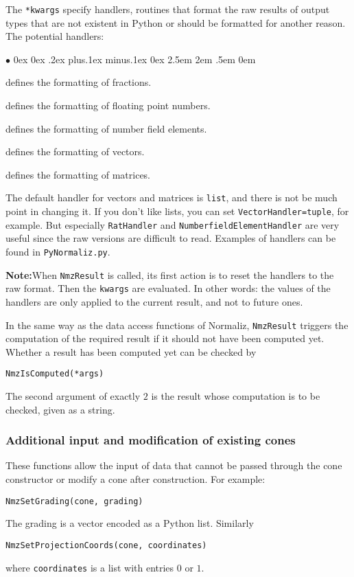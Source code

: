 \documentclass[12pt,a4paper]{scrartcl}
\newcommand{\stdli}{ \topsep0ex \partopsep0ex %
\parsep.2ex plus.1ex minus.1ex \itemsep0ex%
\leftmargin2.5em \labelwidth2em \labelsep.5em \rightmargin0em}%
\renewenvironment{itemize}{\begin{list}{{$\bullet$}}{\stdli}}{\end{list}}
\theoremstyle{definition}
\def\itemtt[#1]{\item[\textbf{\ttt{#1}}]}
\def\ttt{\texttt}
\begin{document}
\begin{small}
The \verb|*kwargs| specify handlers, routines that format the raw results of output types that are not existent in Python or should be formatted for another reason. The potential handlers:
\begin{itemize}
	\itemtt[RatHandler] defines the formatting of fractions.
	
	\itemtt[FloatHandler] defines the formatting of floating point numbers.
	
	\itemtt[NumberfieldElementHandler] defines the formatting of number field elements.
	
	\itemtt[VectorHandler] defines the formatting of vectors.
	
	\itemtt[MatrixHandler] defines the formatting of matrices.
\end{itemize}

The default handler for vectors and matrices is \verb|list|, and there is not be much point in changing it. If you don't like lists, you can set \verb|VectorHandler=tuple|, for example. But especially \verb|RatHandler| and \verb|NumberfieldElementHandler| are very useful since the raw versions are difficult to read. Examples of handlers can be found in \verb|PyNormaliz.py|.

\textbf{Note:}\enspace When \verb|NmzResult| is called, its first action is to reset the handlers to the raw format. Then the \verb|kwargs| are evaluated. In other words: the values of the handlers are only applied to the current result, and not to future ones.

In the same way as the data access functions of Normaliz, \verb|NmzResult| triggers the computation of the required result if it should not have been computed yet. Whether a result has been computed yet can be checked by
\begin{Verbatim}
NmzIsComputed(*args)
\end{Verbatim}
The second argument of exactly $2$ is the result whose computation is to be checked, given as a string.

\subsubsection{Additional input and modification of existing cones}

These functions allow the input of data that cannot be passed through the cone constructor or modify a cone after construction. For example:
\begin{Verbatim}
NmzSetGrading(cone, grading)
\end{Verbatim}
The grading is a vector encoded as a Python list. Similarly
\begin{Verbatim}
NmzSetProjectionCoords(cone, coordinates)
\end{Verbatim}
where \verb|coordinates| is a list with entries $0$ or $1$.


\end{small}
\end{document}
